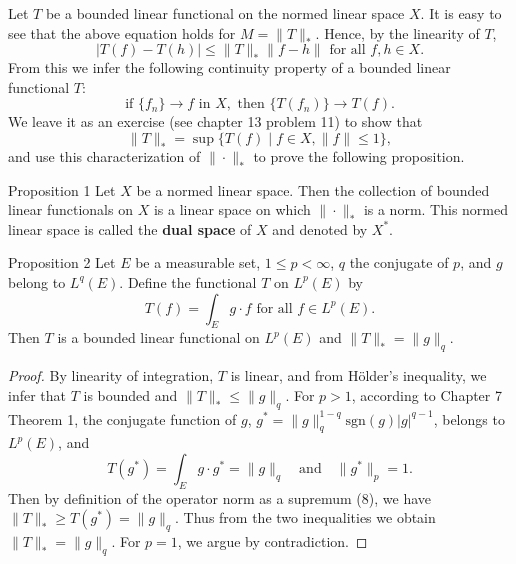 Let $T$ be a bounded linear functional on the normed linear space $X$.
It is easy to see that the above equation holds for $M=\|T\|_*$.
Hence, by the linearity of $T$,
\[
    |T(f)-T(h)|\le \|T\|_*\|f-h\|\text{ for all }f,h\in X.
\]
From this we infer the following continuity property of a bounded linear functional $T$:
\[
    \text{if }\{f_n\}\to f\text{ in }X,\text{ then }\{T(f_n)\}\to T(f).\tag{7}
\]
We leave it as an exercise (see chapter 13 problem 11) to show that 
\[
    \|T\|_*=\sup\{T(f)\mid f\in X,\|f\|\le1\},\tag{8}
\]
and use this characterization of $\|\cdot\|_*$ to prove the following proposition.
\begin{namedthm*}{Proposition 1}
    Let $X$ be a normed linear space.
    Then the collection of bounded linear functionals on $X$ is a linear space on which $\|\cdot\|_*$ is a norm.
    This normed linear space is called the \textbf{dual space} of $X$ and denoted by $X^*$.
\end{namedthm*}
\begin{namedthm*}{Proposition 2}
    Let $E$ be a measurable set, $1\le p<\infty$, $q$ the conjugate of $p$, and $g$ belong to $L^q(E)$.
    Define the functional $T$ on $L^p(E)$ by
    \[
        T(f)=\int_Eg\cdot f\text{ for all }f\in L^p(E).
    \]
    Then $T$ is a bounded linear functional on $L^p(E)$ and $\|T\|_*=\|g\|_q$.
\end{namedthm*}
\begin{proof}
    By linearity of integration, $T$ is linear, and from H\"older's inequality, we infer that $T$ is bounded and $\|T\|_*\le\|g\|_q$.
    For $p>1$, according to Chapter 7 Theorem 1, the conjugate function of $g$, $g^*=\|g\|_q^{1-q}\text{sgn}(g)|g|^{q-1}$, belongs to $L^p(E)$, and 
    \[
        T(g^*)=\int_Eg\cdot g^*=\|g\|_q\quad\text{and}\quad\|g^*\|_p=1.
    \] 
    Then by definition of the operator norm as a supremum (8), we have $\|T\|_*\ge T(g^*)=\|g\|_q$.
    Thus from the two inequalities we obtain $\|T\|_*=\|g\|_q$.
    For $p=1$, we argue by contradiction.

\end{proof}

